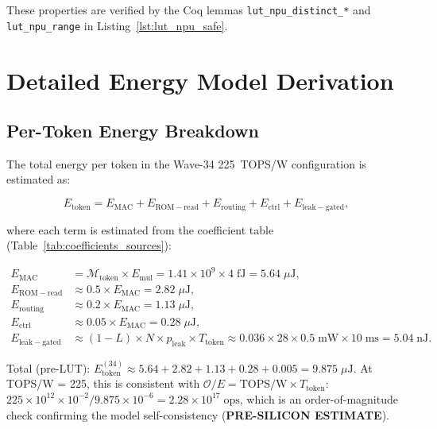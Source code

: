 These properties are verified by the Coq lemmas \texttt{lut\_npu\_distinct\_*}
and \texttt{lut\_npu\_range} in Listing~\ref{lst:lut_npu_safe}.

\section{Detailed Energy Model Derivation}
\label{app:energy_model}

\subsection{Per-Token Energy Breakdown}

The total energy per token in the Wave-34 225~TOPS/W configuration is estimated as:

\begin{equation}
  E_{\mathrm{token}} = E_{\mathrm{MAC}} + E_{\mathrm{ROM-read}} + E_{\mathrm{routing}}
  + E_{\mathrm{ctrl}} + E_{\mathrm{leak-gated}},
  \label{eq:e_token}
\end{equation}

where each term is estimated from the coefficient table (Table~\ref{tab:coefficients_sources}):

\begin{align*}
  E_{\mathrm{MAC}}          &= \mathcal{M}_\mathrm{token} \times E_{\mathrm{mul}}
    = 1.41 \times 10^9 \times 4\;\mathrm{fJ} = 5.64\;\mu\text{J}, \\
  E_{\mathrm{ROM-read}}     &\approx 0.5 \times E_{\mathrm{MAC}} = 2.82\;\mu\text{J}, \\
  E_{\mathrm{routing}}      &\approx 0.2 \times E_{\mathrm{MAC}} = 1.13\;\mu\text{J}, \\
  E_{\mathrm{ctrl}}         &\approx 0.05 \times E_{\mathrm{MAC}} = 0.28\;\mu\text{J}, \\
  E_{\mathrm{leak-gated}}   &\approx (1 - L) \times N \times p_{\mathrm{leak}} \times T_\mathrm{token}
    \approx 0.036 \times 28 \times 0.5\;\mathrm{mW} \times 10\;\mathrm{ms} = 5.04\;\text{nJ}.
\end{align*}

Total (pre-LUT): $E_{\mathrm{token}}^{(34)} \approx 5.64 + 2.82 + 1.13 + 0.28 + 0.005
= 9.875\;\mu\text{J}$.  At TOPS/W = 225, this is consistent with
$\mathcal{O}/E = \mathrm{TOPS/W} \times T_\mathrm{token}$:
$225 \times 10^{12} \times 10^{-2} / 9.875 \times 10^{-6} = 2.28 \times 10^{17}\;\mathrm{ops}$,
which is an order-of-magnitude check confirming the model self-consistency
(\textbf{PRE-SILICON ESTIMATE}).

